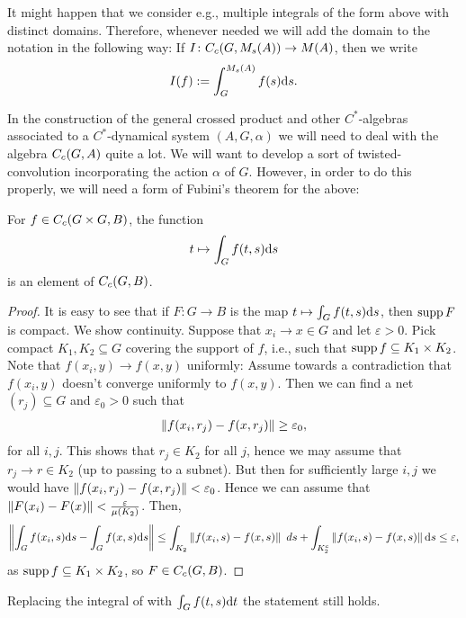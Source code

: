 It might happen that we consider e.g., multiple integrals of the form above with distinct domains. Therefore, whenever needed we will add the domain to the notation in the following way: If $I \colon C_c(G,M_s(A)) \to M(A)$, then we write
\begin{align*}
	I(f) :=\int_G^{M_s(A)} f(s) \mathrm{d} s.
\end{align*}

In the construction of the general crossed product and other $C^*$-algebras associated to a $C^*$-dynamical system $(A,G,\alpha)$ we will need to deal with the algebra $C_c(G,A)$ quite a lot. We will want to develop a sort of twisted-convolution incorporating the action $\alpha$ of $G$. However, in order to do this properly, we will need a form of Fubini's theorem for the above:
\begin{lemma}
For $f \in C_c(G \times G  , B)$, the function
\begin{align*}
	t \mapsto \int_G f(t,s) \mathrm{d} s
\end{align*}
is an element of $C_c(G,B)$.
\label{int:singleint}
\end{lemma}
\begin{proof}
It is easy to see that if $F \colon G \to B$ is the map $t \mapsto \int_G f(t,s) \mathrm{d} s$, then $ \operatorname{supp} F$ is compact. We show continuity. Suppose that $x_i \to x \in G$ and let $ \varepsilon > 0$. Pick compact $K_1,K_2 \subseteq G$ covering the support of $f$, i.e., such that $ \operatorname{supp} f \subseteq K_1 \times K_2$. Note that $f(x_i,y) \to f(x,y)$ uniformly: Assume towards a contradiction that $f(x_i,y)$ doesn't converge uniformly to $f(x,y)$. Then we can find a net $(r_j)\subseteq G$ and $\varepsilon_0 > 0$ such that
\begin{align*}
	\left\lVert f(x_i,r_j) - f(x,r_j) \right\rVert \geq \varepsilon_0,
\end{align*}
for all $i,j$. This shows that $r_j \in K_2$ for all $j$, hence we may assume that $r_j \to r \in K_2$ (up to passing to a subnet). But then for sufficiently large $i,j$ we would have $\left\lVert f(x_i,r_j) - f(x,r_j) \right\rVert < \varepsilon_0$. Hence we can assume that $\left\lVert F(x_i) - F(x) \right\rVert < \frac{\varepsilon}{ \mu(K_2)}$. Then, 
\begin{align*}
	\left\lVert \int_G f(x_i,s) \mathrm{d} s - \int_G f(x,s) \mathrm{d} s \right\rVert \leq \int_{K_2} \left\lVert f(x_i,s) - f(x,s) \right\rVert \ d s + \int_{K_2^c} \left\lVert f(x_i,s) - f(x,s) \right\rVert \mathrm{d} s  \leq \varepsilon,
\end{align*}
as $\operatorname{supp} f \subseteq K_1 \times K_2$, so $F \in C_c(G,B)$.
\end{proof}
\begin{corollary}
Replacing the integral of  with $\int_G f(t,s) \mathrm{d} t$ the statement still holds.
\end{corollary}
